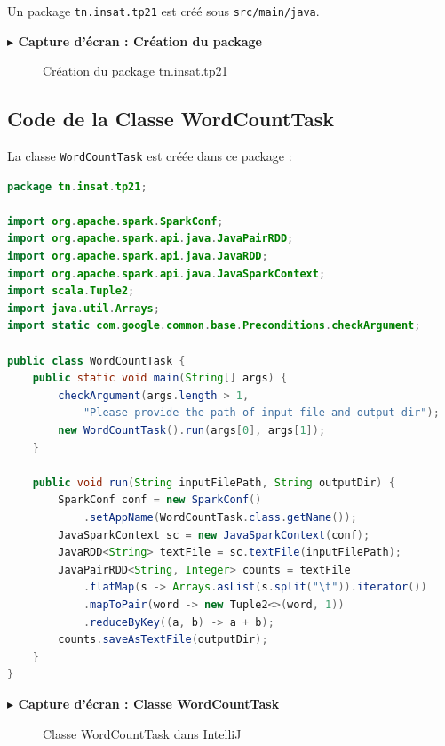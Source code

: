 \documentclass[12pt,a4paper]{report}
\newcommand{\etape}[1]{\vspace{6pt}\textbf{\color{bleuESP}$\blacktriangleright$ #1}\vspace{4pt}}
\begin{document}
Un package \texttt{tn.insat.tp21} est créé sous \texttt{src/main/java}.

\etape{Capture d'écran : Création du package}
\begin{figure}[H]
  \centering
  \caption{Création du package tn.insat.tp21}
\end{figure}

\subsection{Code de la Classe WordCountTask}

La classe \texttt{WordCountTask} est créée dans ce package :

\begin{lstlisting}[language=Java, caption=WordCountTask.java]
package tn.insat.tp21;

import org.apache.spark.SparkConf;
import org.apache.spark.api.java.JavaPairRDD;
import org.apache.spark.api.java.JavaRDD;
import org.apache.spark.api.java.JavaSparkContext;
import scala.Tuple2;
import java.util.Arrays;
import static com.google.common.base.Preconditions.checkArgument;

public class WordCountTask {
    public static void main(String[] args) {
        checkArgument(args.length > 1,
            "Please provide the path of input file and output dir");
        new WordCountTask().run(args[0], args[1]);
    }

    public void run(String inputFilePath, String outputDir) {
        SparkConf conf = new SparkConf()
            .setAppName(WordCountTask.class.getName());
        JavaSparkContext sc = new JavaSparkContext(conf);
        JavaRDD<String> textFile = sc.textFile(inputFilePath);
        JavaPairRDD<String, Integer> counts = textFile
            .flatMap(s -> Arrays.asList(s.split("\t")).iterator())
            .mapToPair(word -> new Tuple2<>(word, 1))
            .reduceByKey((a, b) -> a + b);
        counts.saveAsTextFile(outputDir);
    }
}
\end{lstlisting}

\etape{Capture d'écran : Classe WordCountTask}
\begin{figure}[H]
  \centering
  \caption{Classe WordCountTask dans IntelliJ}
\end{figure}
\end{document}
